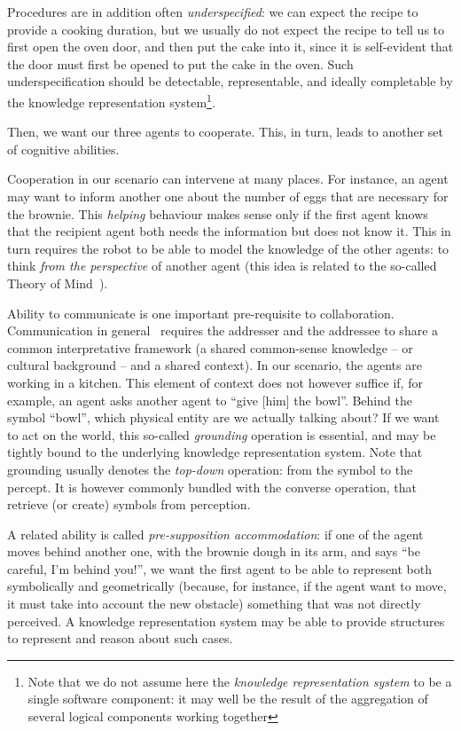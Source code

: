 \documentclass[a4paper, twocolumn]{article}
\begin{document}
Procedures are in addition often \emph{underspecified}: we can expect the recipe
to provide a cooking duration, but we usually do not expect the recipe to tell
us to first open the oven door, and then put the cake into it, since it is
self-evident that the door must first be opened to put the cake in the oven.
Such underspecification should be detectable, representable, and ideally
completable by the knowledge representation system\footnote{Note that we do not
assume here the {\it knowledge representation system} to be a single software
component: it may well be the result of the aggregation of several logical
components working together}.

Then, we want our three agents to cooperate. This, in turn, leads to another
set of cognitive abilities.

Cooperation in our scenario can intervene at many places. For instance, an
agent may want to inform another one about the number of eggs that are
necessary for the brownie. This \emph{helping} behaviour makes sense only if
the first agent knows that the recipient agent both needs the information but
does not know it. This in turn requires the robot to be able to model the
knowledge of the other agents: to think \emph{from the perspective} of another
agent (this idea is related to the so-called Theory of Mind~\cite{Leslie2000}).

Ability to communicate is one important pre-requisite to collaboration.
Communication in general~\cite{Jakobson1960} requires the addresser and the
addressee to share a common interpretative framework (a shared common-sense
knowledge -- or cultural background -- and a shared context). In our scenario,
the agents are working in a kitchen. This element of context does not however
suffice if, for example, an agent asks another agent to ``give {[him]} the
bowl''. Behind the symbol ``bowl'', which physical entity are we actually
talking about? If we want to act on the world, this so-called \emph{grounding}
operation is essential, and may be tightly bound to the underlying knowledge
representation system. Note that grounding usually denotes the {\it top-down}
operation: from the symbol to the percept. It is however commonly bundled with
the converse operation, that retrieve (or create) symbols from perception.

A related ability is called \emph{pre-supposition accommodation}: if one of the
agent moves behind another one, with the brownie dough in its arm, and says
``be careful, I'm behind you!'', we want the first agent to be able to
represent both symbolically and geometrically (because, for instance, if the
agent want to move, it must take into account the new obstacle) something that
was not directly perceived. A knowledge representation system may be able to
provide structures to represent and reason about such cases.
\end{document}
